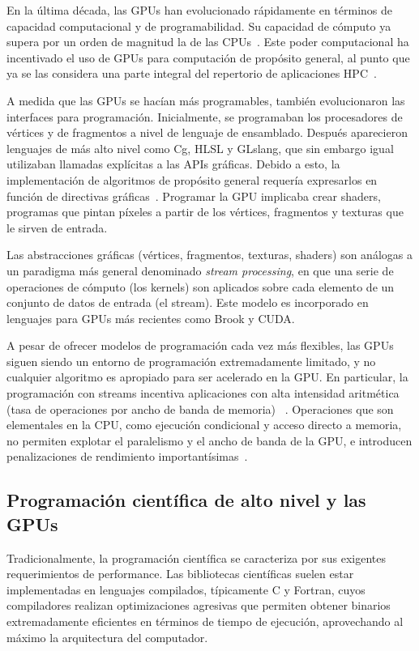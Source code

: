 \documentclass[11pt,spanish]{article}
\begin{document}
En la última década, las GPUs han evolucionado rápidamente en términos de
capacidad computacional y de programabilidad.  Su capacidad de cómputo ya supera
por un orden de magnitud la de las CPUs~\cite{gpupp}.  Este poder computacional ha
incentivado el uso de GPUs para computación de propósito general, al punto que
ya se las considera una parte integral del repertorio de aplicaciones
HPC~\cite{gpu-computing}.

A medida que las GPUs se hacían más programables, también evolucionaron las
interfaces para programación.  Inicialmente, se programaban los procesadores de
vértices y de fragmentos a nivel de lenguaje de ensamblado.  Después aparecieron
lenguajes de más alto nivel como Cg, HLSL y GLslang, que sin embargo igual
utilizaban llamadas explícitas a las APIs gráficas.  Debido a esto, la
implementación de algoritmos de propósito general requería expresarlos en
función de directivas gráficas~\cite[\S2.2]{brookgpu}.  Programar la GPU
implicaba crear shaders, programas que pintan píxeles a partir de los
vértices, fragmentos y texturas que le sirven de entrada.

Las abstracciones gráficas (vértices, fragmentos, texturas, shaders)
son análogas a un paradigma más general denominado \emph{stream processing},
en que una serie de operaciones de cómputo (los kernels) son aplicados sobre
cada elemento de un conjunto de datos de entrada (el stream).  Este modelo es
incorporado en lenguajes para GPUs más recientes como Brook y CUDA.

A pesar de ofrecer modelos de programación cada vez más flexibles, las GPUs
siguen siendo un entorno de programación extremadamente limitado, y no cualquier
algoritmo es apropiado para ser acelerado en la GPU.  En particular, la
programación con streams incentiva aplicaciones con alta intensidad aritmética
(tasa de operaciones por ancho de banda de memoria)
~\cite[\S2.1]{brookgpu}.  Operaciones que son elementales en la CPU, como
ejecución condicional y acceso directo a memoria, no permiten explotar el
paralelismo y el ancho de banda de la GPU, e introducen penalizaciones de
rendimiento importantísimas~\cite[\S{}V.C]{gpu-computing}.

\subsection{Programación científica de alto nivel y las GPUs}
Tradicionalmente, la programación científica se caracteriza por sus
exigentes requerimientos de performance.  Las bibliotecas científicas suelen
estar implementadas en lenguajes compilados, típicamente C y Fortran, cuyos
compiladores realizan optimizaciones agresivas que permiten obtener binarios
extremadamente eficientes en términos de tiempo de ejecución, aprovechando al
máximo la arquitectura del computador.
\end{document}
